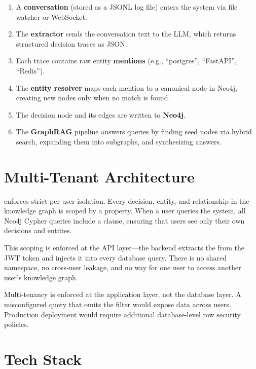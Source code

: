 \begin{enumerate}
    \item A \textbf{conversation} (stored as a JSONL log file) enters the
          system via file watcher or WebSocket.
    \item The \textbf{extractor} sends the conversation text to the LLM, which
          returns structured decision traces as JSON.
    \item Each trace contains raw entity \textbf{mentions} (e.g., ``postgres'',
          ``FastAPI'', ``Redis'').
    \item The \textbf{entity resolver} maps each mention to a canonical node
          in Neo4j, creating new nodes only when no match is found.
    \item The decision node and its  edges are written to
          \textbf{Neo4j}.
    \item The \textbf{GraphRAG} pipeline answers queries by finding seed nodes
          via hybrid search, expanding them into subgraphs, and synthesizing
          answers.
\end{enumerate}


\section{Multi-Tenant Architecture}
\label{sec:multi-tenant}

\sysname{} enforces strict per-user isolation.  Every decision, entity, and
relationship in the knowledge graph is scoped by a  property.
When a user queries the system, all Neo4j Cypher queries include a
 clause, ensuring that users see only their
own decisions and entities.

This scoping is enforced at the API layer---the backend extracts the
 from the JWT token and injects it into every database query.
There is no shared namespace, no cross-user leakage, and no way for one user
to access another user's knowledge graph.

\begin{warning}
Multi-tenancy is enforced at the application layer, not the database layer.
A misconfigured query that omits the  filter would expose data
across users.  Production deployment would require additional database-level
row security policies.
\end{warning}


\section{Tech Stack}
\label{sec:tech-stack}

